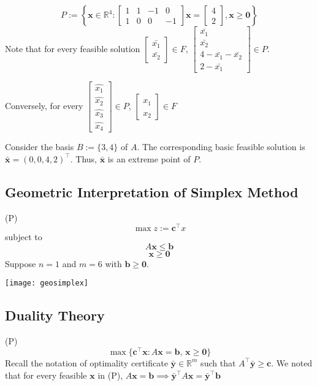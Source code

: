 \[ P:=\left\{\bm{x}\in\mathbb{R}^4:
\begin{bmatrix}
    1&1&-1&0\\
    1&0&0&-1
\end{bmatrix}\bm{x}=
\begin{bmatrix}
    4\\
    2
\end{bmatrix}, \bm{x}\ge \bm{0}\right\} \]
Note that for every feasible solution
$ \begin{bmatrix}
    \bar{x_1}\\
    \bar{x_2}
\end{bmatrix}\in F $,
$ \begin{bmatrix}
    \bar{x_1}\\
    \bar{x_2}\\
    4-\bar{x_1}-\bar{x_2}\\
    2-\bar{x_1}
\end{bmatrix}\in P $.

Conversely, for every 
$ \begin{bmatrix}
    \hat{x_1}\\
    \hat{x_2}\\
    \hat{x_3}\\
    \hat{x_4}
\end{bmatrix}\in P $,
$ \begin{bmatrix}
    \hat{x_1}\\
    \hat{x_2}
\end{bmatrix}\in F $

Consider the basis $ B:=\{3,4\} $ of $ A $. The corresponding basic feasible
solution is $ \bm{\bar{x}}=(0,0,4,2)^\top $. Thus, $ \bm{\bar{x}} $ is
an extreme point of $ P $.

\subsection{Geometric Interpretation of Simplex Method}
(P)
\[ \max z:=\bm{c}^\top x \]
subject to
\[ A \bm{x}\le \bm{b} \]
\[ \bm{x}\ge \bm{0} \]
Suppose $ n=1 $ and $ m=6 $ with $ \bm{b}\ge \bm{0} $.

\begin{center}
    \texttt{[image: geosimplex]}
\end{center}

\subsection{Duality Theory}
(P)
\[ \max \{\bm{c}^{\top} \bm{x}: A \bm{x}=\bm{b},\, \bm{x} \geq \bm{0}\} \]
Recall the notation of optimality certificate $ \bm{\bar{y}}\in\mathbb{R}^m $ such that $ A ^\top \bm{\bar{y}}\ge \bm{c} $. We noted that for
every feasible $ \bm{x} $ in (P), $ A \bm{x}= \bm{b}\implies
\bm{\bar{y}}^\top A \bm{x}=\bm{\bar{y}}^\top \bm{b} $

